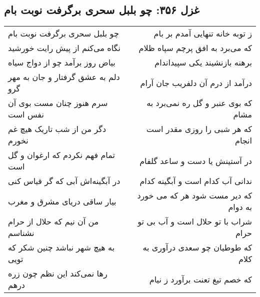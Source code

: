 \begin{center}
\section*{غزل ۳۵۶: چو بلبل سحری برگرفت نوبت بام}
\label{sec:356}
\begin{longtable}{l p{0.5cm} r}
چو بلبل سحری برگرفت نوبت بام
&&
ز توبه خانه تنهایی آمدم بر بام
\\
نگاه می‌کنم از پیش رایت خورشید
&&
که می‌برد به افق پرچم سپاه ظلام
\\
بیاض روز برآمد چو از دواج سیاه
&&
برهنه بازنشیند یکی سپیداندام
\\
دلم به عشق گرفتار و جان به مهر گرو
&&
درآمد از درم آن دلفریب جان آرام
\\
سرم هنوز چنان مست بوی آن نفس است
&&
که بوی عنبر و گل ره نمی‌برد به مشام
\\
دگر من از شب تاریک هیچ غم نخورم
&&
که هر شبی را روزی مقدر است انجام
\\
تمام فهم نکردم که ارغوان و گل است
&&
در آستینش یا دست و ساعد گلفام
\\
در آبگینه‌اش آبی که گر قیاس کنی
&&
ندانی آب کدام است و آبگینه کدام
\\
بیار ساقی دریای مشرق و مغرب
&&
که دیر مست شود هر که می خورد به دوام
\\
من آن نیم که حلال از حرام نشناسم
&&
شراب با تو حلال است و آب بی تو حرام
\\
به هیچ شهر نباشد چنین شکر که تویی
&&
که طوطیان چو سعدی درآوری به کلام
\\
رها نمی‌کند این نظم چون زره درهم
&&
که خصم تیغ تعنت برآورد ز نیام
\\
\end{longtable}
\end{center}
